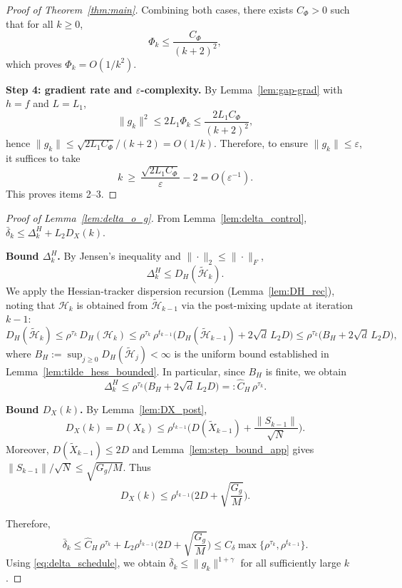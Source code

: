 \documentclass[11pt,a4paper]{article}
\def\cO{O}%
\newcommand{\cO}{\mathcal{O}}
\begin{document}
\begin{proof}[Proof of Theorem~\ref{thm:main}]
Combining both cases, there exists $C_\Phi>0$ such that for all $k\ge 0$,
\[
\Phi_k\le \frac{C_\Phi}{(k+2)^2},
\]
which proves $\Phi_k=\cO(1/k^2)$.

\smallskip
\noindent\textbf{Step 4: gradient rate and $\varepsilon$-complexity.}
By Lemma~\ref{lem:gap-grad} with $h=f$ and $L=L_1$,
\[
\|g_k\|^2\le 2L_1\Phi_k\le \frac{2L_1 C_\Phi}{(k+2)^2},
\]
hence $\|g_k\|\le \sqrt{2L_1 C_\Phi}/(k+2)=\cO(1/k)$.
Therefore, to ensure $\|g_k\|\le \varepsilon$, it suffices to take
\[
k\ \ge\ \frac{\sqrt{2L_1 C_\Phi}}{\varepsilon}-2
=\cO(\varepsilon^{-1}).
\]
This proves items 2--3.
\end{proof}

\begin{proof}[Proof of Lemma~\ref{lem:delta_o_g}]
From Lemma~\ref{lem:delta_control}, $\bar\delta_k\le \Delta_k^H+L_2D_X(k)$.

\smallskip
\noindent\textbf{Bound $\Delta_k^H$.}
By Jensen's inequality and $\|\cdot\|_2\le \|\cdot\|_F$,
\[
\Delta_k^H\le D_H(\tilde{\mathcal H}_k).
\]
We apply the Hessian-tracker dispersion recursion (Lemma~\ref{lem:DH_rec}),
noting that $\mathcal H_k$ is obtained from $\tilde{\mathcal H}_{k-1}$
via the post-mixing update at iteration $k{-}1$:
\[
D_H(\tilde{\mathcal H}_k)
\le \rho^{\tau_k}\,D_H(\mathcal H_k)
\le \rho^{\tau_k}\,\rho^{t_{k-1}}\big(D_H(\tilde{\mathcal H}_{k-1})+2\sqrt{d}\,L_2D\big)
\le \rho^{\tau_k}\big(B_H+2\sqrt{d}\,L_2D\big),
\]
where $B_H:=\sup_{j\ge 0}D_H(\tilde{\mathcal H}_j)<\infty$ is the uniform bound
established in Lemma~\ref{lem:tilde_hess_bounded}.
In particular, since $B_H$ is finite, we obtain
\[
\Delta_k^H\le \rho^{\tau_k}\big(B_H+2\sqrt{d}\,L_2D\big)
=:\hat C_H\,\rho^{\tau_k}.
\]

\smallskip
\noindent\textbf{Bound $D_X(k)$.}
By Lemma~\ref{lem:DX_post},
\[
D_X(k)=D(X_k)\le \rho^{t_{k-1}}\Big(D(\tilde X_{k-1})+\frac{\|S_{k-1}\|}{\sqrt N}\Big).
\]
Moreover, $D(\tilde X_{k-1})\le 2D$ and Lemma~\ref{lem:step_bound_app} gives $\|S_{k-1}\|/\sqrt N\le \sqrt{G_g/M}$.
Thus
\[
D_X(k)\le \rho^{t_{k-1}}\Big(2D+\sqrt{\frac{G_g}{M}}\Big).
\]

\smallskip
Therefore,
\[
\bar\delta_k\le \hat C_H\,\rho^{\tau_k}
+L_2\rho^{t_{k-1}}\Big(2D+\sqrt{\frac{G_g}{M}}\Big)
\le C_\delta\max\{\rho^{\tau_k},\rho^{t_{k-1}}\}.
\]
Using \eqref{eq:delta_schedule}, we obtain $\bar\delta_k\le \|g_k\|^{1+\gamma}$ for all sufficiently large $k$.
\end{proof}
\end{document}

